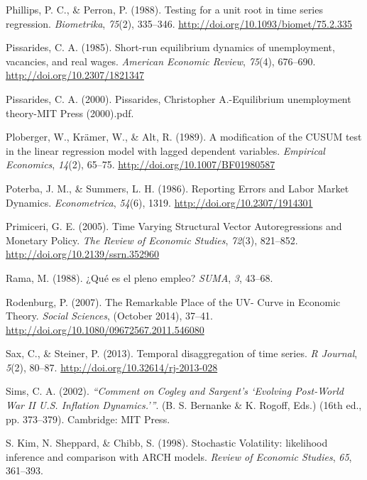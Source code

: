 \documentclass[12pt,oneside]{reedthesis}
\begin{document}
\leavevmode\hypertarget{ref-PhillipsPerron1988}{}%
Phillips, P. C., \& Perron, P. (1988). Testing for a unit root in time series regression. \emph{Biometrika}, \emph{75}(2), 335--346. \url{http://doi.org/10.1093/biomet/75.2.335}

\leavevmode\hypertarget{ref-Pissarides1985}{}%
Pissarides, C. A. (1985). Short-run equilibrium dynamics of unemployment, vacancies, and real wages. \emph{American Economic Review}, \emph{75}(4), 676--690. \url{http://doi.org/10.2307/1821347}

\leavevmode\hypertarget{ref-Pissarides2000}{}%
Pissarides, C. A. (2000). Pissarides, Christopher A.-Equilibrium unemployment theory-MIT Press (2000).pdf.

\leavevmode\hypertarget{ref-Ploberger1989}{}%
Ploberger, W., Krämer, W., \& Alt, R. (1989). A modification of the CUSUM test in the linear regression model with lagged dependent variables. \emph{Empirical Economics}, \emph{14}(2), 65--75. \url{http://doi.org/10.1007/BF01980587}

\leavevmode\hypertarget{ref-Poterba1986}{}%
Poterba, J. M., \& Summers, L. H. (1986). Reporting Errors and Labor Market Dynamics. \emph{Econometrica}, \emph{54}(6), 1319. \url{http://doi.org/10.2307/1914301}

\leavevmode\hypertarget{ref-Primiceri2005}{}%
Primiceri, G. E. (2005). Time Varying Structural Vector Autoregressions and Monetary Policy. \emph{The Review of Economic Studies}, \emph{72}(3), 821--852. \url{http://doi.org/10.2139/ssrn.352960}

\leavevmode\hypertarget{ref-Rama1988}{}%
Rama, M. (1988). ¿Qué es el pleno empleo? \emph{SUMA}, \emph{3}, 43--68.

\leavevmode\hypertarget{ref-Rodenburg2007}{}%
Rodenburg, P. (2007). The Remarkable Place of the UV- Curve in Economic Theory. \emph{Social Sciences}, (October 2014), 37--41. \url{http://doi.org/10.1080/09672567.2011.546080}

\leavevmode\hypertarget{ref-Sax2013}{}%
Sax, C., \& Steiner, P. (2013). Temporal disaggregation of time series. \emph{R Journal}, \emph{5}(2), 80--87. \url{http://doi.org/10.32614/rj-2013-028}

\leavevmode\hypertarget{ref-Sims2002}{}%
Sims, C. A. (2002). \emph{``Comment on Cogley and Sargent's `Evolving Post-World War II U.S. Inflation Dynamics.'''}. (B. S. Bernanke \& K. Rogoff, Eds.) (16th ed., pp. 373--379). Cambridge: MIT Press.

\leavevmode\hypertarget{ref-Kim1998}{}%
S. Kim, N. Sheppard, \& Chibb, S. (1998). Stochastic Volatility: likelihood inference and comparison with ARCH models. \emph{Review of Economic Studies}, \emph{65}, 361--393.
\end{document}
